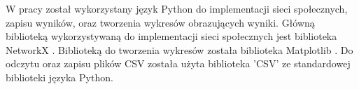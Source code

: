 W pracy został wykorzystany język Python do implementacji sieci społecznych, zapisu wyników, oraz tworzenia wykresów obrazujących wyniki.
Główną biblioteką wykorzystywaną do implementacji sieci społecznych jest biblioteka NetworkX \cite{NetworkX}.
Biblioteką do tworzenia wykresów została biblioteka Matplotlib \cite{Matplotlib}.
Do odczytu oraz zapisu plików CSV została użyta biblioteka 'CSV' \cite{CSV} ze standardowej biblioteki języka Python.
